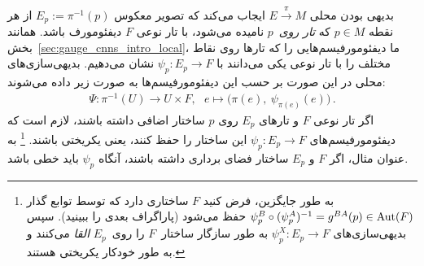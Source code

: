 بدیهی بودن محلی $E\!\xrightarrow{\pi}\!M$ ایجاب می‌کند که تصویر معکوس $E_p:=\pi^{-1}(p)$ از هر نقطه $p\in M$ که \emph{تار روی}~$p$ نامیده می‌شود، با تار نوعی $F$ دیفئومورف باشد.
همانند بخش~\ref{sec:gauge_cnns_intro_local}، ما دیفئومورفیسم‌هایی را که تارها روی نقاط مختلف را با تار نوعی یکی می‌دانند با $\psi_p:E_p\to F$ نشان می‌دهیم.
بدیهی‌سازی‌های محلی در این صورت بر حسب این دیفئومورفیسم‌ها به صورت زیر داده می‌شوند:
\begin{align}\label{eq:Psi_via_psi}
	\Psi:\pi^{-1}(U)\to U\times F,\ \ \ e\mapsto \big(\pi(e),\: \psi_{\pi(e)}(e)\big) \,.
\end{align}
اگر تار نوعی $F$ و تارهای $E_p$ روی $p$ ساختار اضافی داشته باشند، لازم است که دیفئومورفیسم‌های $\psi_p: E_p\to F$ این ساختار را حفظ کنند، یعنی یکریختی باشند.%
\footnote{
	به طور جایگزین، فرض کنید $F$ ساختاری دارد که توسط توابع گذار $\psi_p^B \circ (\psi_p^A)^{-1} = g^{BA}(p) \in \operatorname{Aut}(F)$ حفظ می‌شود (پاراگراف بعدی را ببینید).
	سپس بدیهی‌سازی‌های $\psi_p^X: E_p \to F$ به طور سازگار ساختار~$F$ را روی~$E_p$ \emph{القا} می‌کنند و به طور خودکار یکریختی هستند.
}
به عنوان مثال، اگر $F$ و $E_p$ ساختار فضای برداری داشته باشند، آنگاه $\psi_p$ باید خطی باشد.



